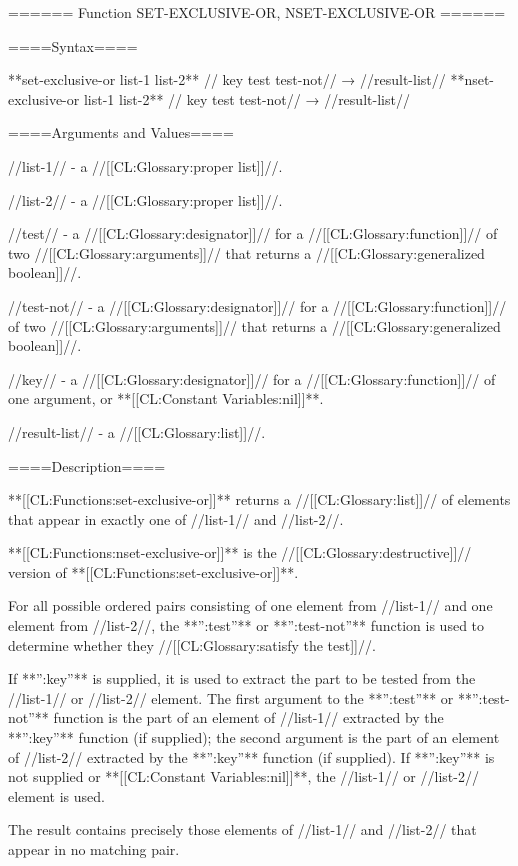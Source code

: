 ====== Function SET-EXCLUSIVE-OR, NSET-EXCLUSIVE-OR ======

====Syntax====

**set-exclusive-or {list-1 list-2** //\key} key test test-not// → //result-list// **nset-exclusive-or {list-1 list-2** //\key} key test test-not// → //result-list//

====Arguments and Values====

//list-1// - a //[[CL:Glossary:proper list]]//.

//list-2// - a //[[CL:Glossary:proper list]]//.

//test// - a //[[CL:Glossary:designator]]// for a //[[CL:Glossary:function]]// of two //[[CL:Glossary:arguments]]// that returns a //[[CL:Glossary:generalized boolean]]//.

//test-not// - a //[[CL:Glossary:designator]]// for a //[[CL:Glossary:function]]// of two //[[CL:Glossary:arguments]]// that returns a //[[CL:Glossary:generalized boolean]]//.

//key// - a //[[CL:Glossary:designator]]// for a //[[CL:Glossary:function]]// of one argument, or **[[CL:Constant Variables:nil]]**.

//result-list// - a //[[CL:Glossary:list]]//.

====Description====

**[[CL:Functions:set-exclusive-or]]** returns a //[[CL:Glossary:list]]// of elements that appear in exactly one of //list-1// and //list-2//.

**[[CL:Functions:nset-exclusive-or]]** is the //[[CL:Glossary:destructive]]// version of **[[CL:Functions:set-exclusive-or]]**.

For all possible ordered pairs consisting of one element from //list-1// and one element from //list-2//, the **'':test''** or **'':test-not''** function is used to determine whether they //[[CL:Glossary:satisfy the test]]//.

If **'':key''** is supplied, it is used to extract the part to be tested from the //list-1// or //list-2// element. The first argument to the **'':test''** or **'':test-not''** function is the part of an element of //list-1// extracted by the **'':key''** function (if supplied); the second argument is the part of an element of //list-2// extracted by the **'':key''** function (if supplied). If **'':key''** is not supplied or **[[CL:Constant Variables:nil]]**, the //list-1// or //list-2// element is used.

The result contains precisely those elements of //list-1// and //list-2// that appear in no matching pair.

